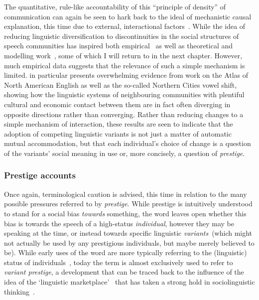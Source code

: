 The quantitative, rule-like accountability of this ``principle of density'' of communication can again be seen to hark back to the ideal of mechanistic causal explanation, this time due to external, interactional factors~\citep[p.19]{Labov2001}. While the idea of reducing linguistic diversification to discontinuities in the social structures of speech communities has inspired both empirical~\citep{Milroy1985,Herold1997,Trudgill2008} as well as theoretical and modelling work~\citep{Nettle1999,Silva2008,Gong2012,Blythe2012,Pierrehumbert2014}, some of which I will return to in the next chapter.
However, much empirical data suggests that the relevance of such a simple mechanism is limited.
\citet[ch.6-10]{Labov2010} in particular presents overwhelming evidence from work on the Atlas of North American English as well as the so-called Northern Cities vowel shift, showing how the linguistic systems of neighbouring communities with plentiful cultural and economic contact between them are in fact often diverging in opposite directions rather than converging. Rather than reducing changes to a simple mechanism of interaction, these results are seen to indicate that the adoption of competing linguistic variants is not just a matter of automatic mutual accommodation, but that each individual's choice of change is a question of the variants' social meaning in use or, more concisely, a question of \emph{prestige}.


\subsubsection{Prestige accounts}
\label{sec:prestige}

Once again, terminological caution is advised, this time in relation to the many possible pressures referred to by \emph{prestige}. While prestige is intuitively understood to stand for a social bias \emph{towards} something, the word leaves open whether this bias is towards the speech of a high-status \emph{individual}, however they may be speaking at the time, or instead towards specific linguistic \emph{variants}~(which might not actually be used by any prestigious individuals, but maybe merely believed to be). While early uses of the word are more typically referring to the (linguistic) status of individuals~\citep{Tarde1903,Fries1949}, today the term is almost exclusively used to refer to \emph{variant prestige}, a development that can be traced back to the influence of the idea of the `linguistic marketplace'~\citep{Bourdieu1977} that has taken a strong hold in sociolinguistic thinking~\citep{Cedergren1987,Tagliamonte2015}.

